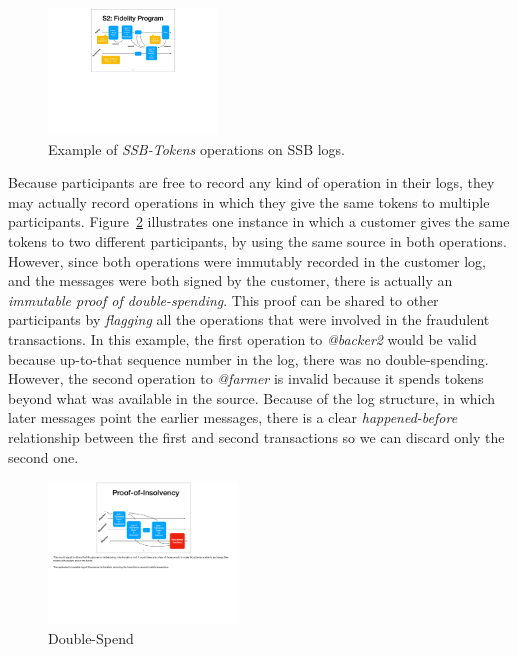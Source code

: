 \documentclass[sigplan,screen,10pt]{acmart}
\newcommand\ssbtokens[0]{\textit{SSB-Tokens} }
\begin{document}
\begin{figure}[htbp]
\centering
\includegraphics[width=0.40\textwidth]{./figures/example-src}
\caption{Example of \ssbtokens operations on SSB logs.}
\label{figure:example}
\end{figure}

Because participants are free to record any kind of operation in their logs, they may actually record operations in which they give the same tokens to multiple participants. Figure~\ref{figure:double-spend} illustrates one instance in which a customer gives the same tokens to two different participants, by using the same source in both operations. However, since both operations were immutably recorded in the customer log, and the messages were both signed by the customer, there is actually an \textit{immutable proof of double-spending}. This proof can be shared to other participants by \textit{flagging} all the operations that were involved in the fraudulent transactions. In this example, the first operation to \textit{@backer2} would be valid because up-to-that sequence number in the log, there was no double-spending. However, the second operation to \textit{@farmer} is  invalid because it spends tokens beyond what was available in the source. Because of the log structure, in which later messages point the earlier messages, there is a clear \textit{happened-before} relationship between the first and second transactions so we can discard only the second one.

\begin{figure}[htbp]
\includegraphics[width=0.45\textwidth]{figures/double-spend}
\caption{Double-Spend}
\label{figure:double-spend}
\end{figure}
\end{document}
